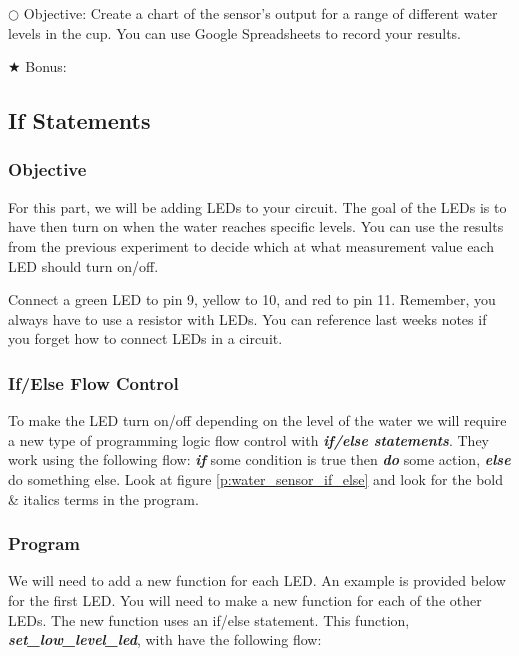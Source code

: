 \documentclass[12pt]{article}
\begin{document}
\noindent $\bigcirc$ Objective: Create a chart of the sensor's output for a range of different water levels in the cup. You can use Google Spreadsheets to record your results.

\noindent $\bigstar$ Bonus: 








\subsection{If Statements}

\subsubsection{Objective}

For this part, we will be adding LEDs to your circuit. The goal of the LEDs is to have then turn on when the water reaches specific levels. You can use the results from the previous experiment to decide which at what measurement value each LED should turn on/off.

Connect a green LED to pin 9, yellow to 10, and red to pin 11. Remember, you always have to use a resistor with LEDs. You can reference last weeks notes if you forget how to connect LEDs in a circuit.

\subsubsection{If/Else Flow Control}

To make the LED turn on/off depending on the level of the water we will require a new type of programming logic flow control with \textbf{\textit{if/else statements}}. They work using the following flow: \textbf{\textit{if}} some condition is true then \textbf{\textit{do}} some action, \textbf{\textit{else}} do something else. Look at figure \ref{p:water_sensor_if_else} and look for the bold \& italics terms in the program.


\subsubsection{Program}

We will need to add a new function for each LED. An example is provided below for the first LED. You will need to make a new function for each of the other LEDs. The new function uses an if/else statement. This function, \textbf{\textit{set\_low\_level\_led}}, with have the following flow:
\end{document}
